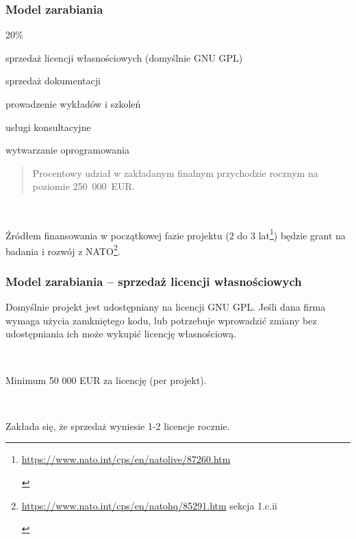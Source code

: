 \documentclass{beamer}
\begin{document}
\begin{frame}
    \frametitle{Model zarabiania}

    \begin{labeling}{20\%}
        \item[20\%] sprzedaż licencji własnościowych (domyślnie GNU GPL)
        \item[4\%] sprzedaż dokumentacji
        \item[20\%] prowadzenie wykładów i szkoleń
        \item[8\%] usługi konsultacyjne
        \item[48\%] wytwarzanie oprogramowania
    \end{labeling}

    \begin{quote}
        \begin{tiny}
            Procentowy udział w zakładanym finalnym przychodzie rocznym na
            poziomie 250~000~EUR.
        \end{tiny}
    \end{quote}

    ~

    Źródłem finansowania w początkowej fazie projektu (2 do 3
    lat\footnote{\begin{tiny}\url{https://www.nato.int/cps/en/natolive/87260.htm}\end{tiny}})
    będzie grant na badania i rozwój z
    NATO\footnote{\begin{tiny}\url{https://www.nato.int/cps/en/natohq/85291.htm} sekcja 1.c.ii\end{tiny}}.
\end{frame}

\begin{frame}
    \frametitle{Model zarabiania -- sprzedaż licencji własnościowych}

    Domyślnie projekt jest udostępniany na licencji GNU GPL. Jeśli dana firma
    wymaga użycia zamkniętego kodu, lub potrzebuje wprowadzić zmiany bez
    udostępniania ich może wykupić licencję własnościową.

    ~

    Minimum 50 000 EUR za licencję (per projekt).

    ~

    Zakłada się, że sprzedaż wyniesie 1-2 licencje rocznie.
\end{frame}
\end{document}

